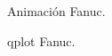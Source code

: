 \documentclass[a4paper,12pt]{article}
\begin{document}
\begin{figure}[H]
    \centering
    \begin{adjustbox}{scale = 0.65, max width=\columnwidth}
    \end{adjustbox}
    \caption{Animación Fanuc.}
\end{figure}

\begin{figure}[H]
    \centering
    \begin{adjustbox}{scale = 0.65, max width=\columnwidth}
    \end{adjustbox}
    \caption{qplot Fanuc.}
    \label{qplot fanucm 3}
\end{figure}
\end{document}
